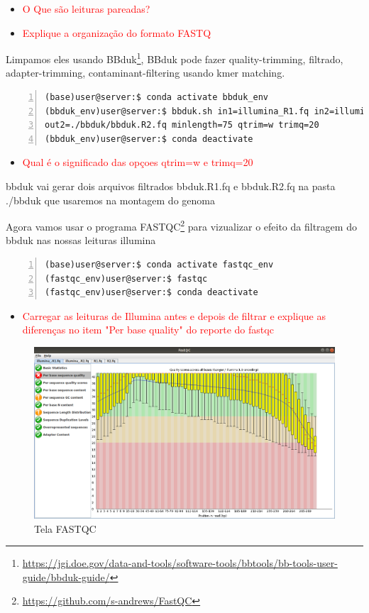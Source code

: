 \documentclass[letter,11pt]{book}
\begin{document}
\begin{itemize}
\item \textcolor{red}{O Que são leituras pareadas?}
\item \textcolor{red}{Explique a organização do formato FASTQ}
\end{itemize}

Limpamos eles usando BBduk\footnote{\url{https://jgi.doe.gov/data-and-tools/software-tools/bbtools/bb-tools-user-guide/bbduk-guide/}}, BBduk pode fazer quality-trimming, filtrado, adapter-trimming, contaminant-filtering usando kmer matching.

\begin{Verbatim}[commandchars=!\{\}, numbers=left,label= Limpando leituras Illumina com bbduk,frame=topline,fontsize=\scriptsize]
(base)user@server:$ conda activate bbduk_env
(bbduk_env)user@server:$ bbduk.sh in1=illumina_R1.fq in2=illumina_R2.fq out1=./bbduk/bbduk.R1.fq \
out2=./bbduk/bbduk.R2.fq minlength=75 qtrim=w trimq=20
(bbduk_env)user@server:$ conda deactivate
\end{Verbatim}


\begin{itemize}
\item \textcolor{red}{Qual é o significado das opçoes qtrim=w e trimq=20}
\end{itemize}


bbduk vai gerar dois arquivos filtrados bbduk.R1.fq e bbduk.R2.fq na pasta ./bbduk que usaremos na montagem do genoma

Agora vamos usar o programa FASTQC\footnote{\url{https://github.com/s-andrews/FastQC}} para vizualizar o efeito da filtragem do bbduk nas nossas leituras illumina

\begin{Verbatim}[commandchars=!\{\}, numbers=left,label= Abrindo o FASTQC,frame=topline,fontsize=\scriptsize]
(base)user@server:$ conda activate fastqc_env 
(fastqc_env)user@server:$ fastqc
(fastqc_env)user@server:$ conda deactivate
\end{Verbatim}

\begin{itemize}
\item \textcolor{red}{Carregar as leituras de Illumina antes e depois de filtrar e explique as diferenças no item "Per base quality" do reporte do fastqc}
\end{itemize}

\begin{figure}[h!]
\centering
 \includegraphics[width=12cm]{Figs/fastqc.png}
 \caption{\label{fig:fastqc}Tela FASTQC}
\end{figure}
\end{document}
